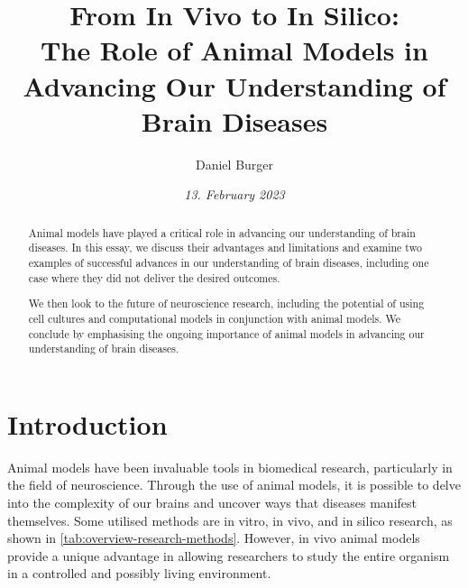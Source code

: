 \documentclass[10pt]{article}
\title{\textbf{From In Vivo to In Silico:} \\ The Role of Animal Models in Advancing Our Understanding of Brain Diseases}
\author[ ]{Daniel Burger}
\affil[ ]{\textbf{King’s College London}}
\affil[ ]{\href{mailto:daniel.burger@kcl.ac.uk}{daniel.burger@kcl.ac.uk}}
\date{\textit{13. February 2023}}
\begin{document}

\maketitle
\thispagestyle{empty}

\begin{sloppypar} %
  \begin{abstract}
    Animal models have played a critical role in advancing our understanding of brain diseases. In this essay, we discuss their advantages and limitations and examine two examples of successful advances in our understanding of brain diseases, including one case where they did not deliver the desired outcomes.

    We then look to the future of neuroscience research, including the potential of using cell cultures and computational models in conjunction with animal models. We conclude by emphasising the ongoing importance of animal models in advancing our understanding of brain diseases.

  \end{abstract}
  \pagebreak

  \tableofcontents
  \pagebreak

  \listoffigures
  \pagebreak

  \listoftables
  \pagebreak


  \doublespacing

  \section{Introduction}
  \label{sec:introduction}

  Animal models have been invaluable tools in biomedical research, particularly in the field of neuroscience. Through the use of animal models, it is possible to delve into the complexity of our brains and uncover ways that diseases manifest themselves. Some utilised methods are in vitro, in vivo, and in silico research, as shown in \autoref{tab:overview-research-methods}. However, in vivo animal models provide a unique advantage in allowing researchers to study the entire organism in a controlled and possibly living environment.


\end{sloppypar}
\end{document}
